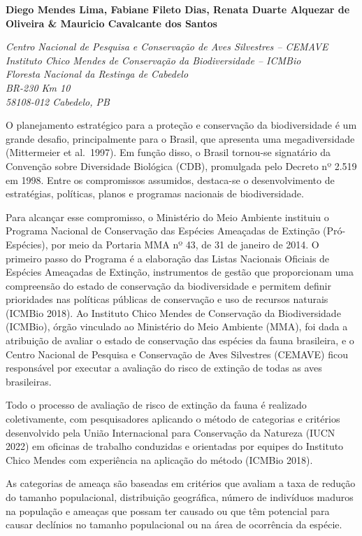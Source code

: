 \documentclass[
  oneside]{scrbook}
\begin{document}
\pagestyle{headings}

\textbf{Diego Mendes Lima, Fabiane Fileto Dias, Renata Duarte Alquezar de Oliveira \& Mauricio Cavalcante dos Santos}

\emph{Centro Nacional de Pesquisa e Conservação de Aves Silvestres -- CEMAVE}\\
\emph{Instituto Chico Mendes de Conservação da Biodiversidade -- ICMBio}\\
\emph{Floresta Nacional da Restinga de Cabedelo}\\
\emph{BR-230 Km 10}\\
\emph{58108-012 Cabedelo, PB}

O planejamento estratégico para a proteção e conservação da biodiversidade é um grande desafio, principalmente para o Brasil, que apresenta uma megadiversidade (Mittermeier et al.~1997). Em função disso, o Brasil tornou-se signatário da Convenção sobre Diversidade Biológica (CDB), promulgada pelo Decreto nº 2.519 em 1998. Entre os compromissos assumidos, destaca-se o desenvolvimento de estratégias, políticas, planos e programas nacionais de biodiversidade.

Para alcançar esse compromisso, o Ministério do Meio Ambiente instituiu o Programa Nacional de Conservação das Espécies Ameaçadas de Extinção (Pró-Espécies), por meio da Portaria MMA nº 43, de 31 de janeiro de 2014. O primeiro passo do Programa é a elaboração das Listas Nacionais Oficiais de Espécies Ameaçadas de Extinção, instrumentos de gestão que proporcionam uma compreensão do estado de conservação da biodiversidade e permitem definir prioridades nas políticas públicas de conservação e uso de recursos naturais (ICMBio 2018). Ao Instituto Chico Mendes de Conservação da Biodiversidade (ICMBio), órgão vinculado ao Ministério do Meio Ambiente (MMA), foi dada a atribuição de avaliar o estado de conservação das espécies da fauna brasileira, e o Centro Nacional de Pesquisa e Conservação de Aves Silvestres (CEMAVE) ficou responsável por executar a avaliação do risco de extinção de todas as aves brasileiras.

Todo o processo de avaliação de risco de extinção da fauna é realizado coletivamente, com pesquisadores aplicando o método de categorias e critérios desenvolvido pela União Internacional para Conservação da Natureza (IUCN 2022) em oficinas de trabalho conduzidas e orientadas por equipes do Instituto Chico Mendes com experiência na aplicação do método (ICMBio 2018).

As categorias de ameaça são baseadas em critérios que avaliam a taxa de redução do tamanho populacional, distribuição geográfica, número de indivíduos maduros na população e ameaças que possam ter causado ou que têm potencial para causar declínios no tamanho populacional ou na área de ocorrência da espécie.
\end{document}
